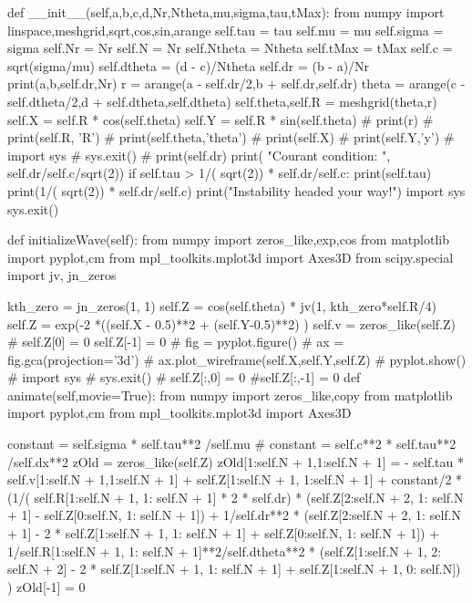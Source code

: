 \begin{enumerate}
\begin{codeexample}
\begin{VerbatimOut}{\listingFile}
    def __init__(self,a,b,c,d,Nr,Ntheta,mu,sigma,tau,tMax):
        from numpy import linspace,meshgrid,sqrt,cos,sin,arange
        self.tau = tau
        self.mu = mu
        self.sigma = sigma
        self.Nr = Nr
        self.N = Nr
        self.Ntheta = Ntheta
        self.tMax = tMax
        self.c = sqrt(sigma/mu)
        self.dtheta = (d - c)/Ntheta
        self.dr = (b - a)/Nr
        print(a,b,self.dr,Nr)
        r = arange(a - self.dr/2,b + self.dr,self.dr)
        theta = arange(c - self.dtheta/2,d + self.dtheta,self.dtheta)
        self.theta,self.R = meshgrid(theta,r)
        self.X = self.R * cos(self.theta)
        self.Y = self.R * sin(self.theta)
#        print(r)
#        print(self.R, 'R')
#        print(self.theta,'theta')
#        print(self.X)
#        print(self.Y,'y')
#        import sys
#        sys.exit()
#        print(self.dr)
        print( "Courant condition: ", self.dr/self.c/sqrt(2))
        if self.tau > 1/( sqrt(2)) *  self.dr/self.c:
            print(self.tau)
            print(1/( sqrt(2)) *  self.dr/self.c)
            print("Instability headed your way!")
            import sys
            sys.exit()

    def initializeWave(self):
        from numpy import zeros_like,exp,cos
        from matplotlib import pyplot,cm
        from mpl_toolkits.mplot3d import Axes3D
        from scipy.special import jv, jn_zeros

        kth_zero = jn_zeros(1, 1)
        self.Z = cos(self.theta) * jv(1, kth_zero*self.R/4)
        self.Z = exp(-2 *((self.X - 0.5)**2 + (self.Y-0.5)**2) )
        self.v = zeros_like(self.Z)
        #        self.Z[0] = 0
        self.Z[-1] = 0
#        fig = pyplot.figure()
#        ax = fig.gca(projection='3d')
#        ax.plot_wireframe(self.X,self.Y,self.Z)
#        pyplot.show()
#        import sys
#        sys.exit()
        # self.Z[:,0] = 0
        #self.Z[:,-1] = 0
    def animate(self,movie=True):
        from numpy import zeros_like,copy
        from matplotlib import pyplot,cm
        from mpl_toolkits.mplot3d import Axes3D

        constant = self.sigma * self.tau**2 /self.mu
        #        constant = self.c**2 * self.tau**2 /self.dx**2
        zOld = zeros_like(self.Z)
        zOld[1:self.N + 1,1:self.N + 1] = - self.tau * self.v[1:self.N + 1,1:self.N + 1] + self.Z[1:self.N + 1, 1:self.N + 1] + constant/2 * (1/( self.R[1:self.N + 1, 1: self.N + 1] * 2 * self.dr) * (self.Z[2:self.N + 2, 1: self.N + 1] - self.Z[0:self.N, 1: self.N + 1]) + 1/self.dr**2 * (self.Z[2:self.N + 2, 1: self.N + 1] - 2 * self.Z[1:self.N + 1, 1: self.N + 1] + self.Z[0:self.N, 1: self.N + 1]) + 1/self.R[1:self.N + 1, 1: self.N + 1]**2/self.dtheta**2 * (self.Z[1:self.N + 1, 2: self.N + 2] - 2 * self.Z[1:self.N + 1, 1: self.N + 1] + self.Z[1:self.N + 1, 0: self.N])    )
        zOld[-1] = 0


\end{VerbatimOut}
\end{codeexample}
\end{enumerate}

